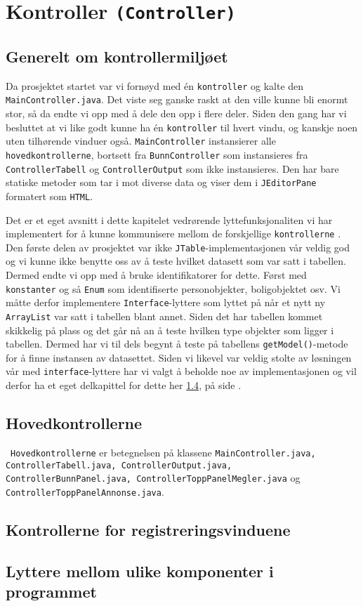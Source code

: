 \section{Kontroller \texttt{(Controller)}} \label{sec:kontroller}

\subsection{Generelt om kontrollermiljøet}
Da prosjektet startet var vi fornøyd med én \texttt{kontroller} og kalte den \texttt{MainController.java}. Det viste seg ganske raskt at den ville kunne bli enormt stor, så da endte vi opp med å dele den opp i flere deler. Siden den gang har vi besluttet at vi like godt kunne ha én \texttt{kontroller} til hvert vindu, og kanskje noen uten tilhørende vinduer også.
\texttt{MainController} instansierer alle \texttt{hovedkontrollerne}, bortsett fra \texttt{BunnController} som instansieres fra \texttt{ControllerTabell} og \texttt{ControllerOutput} som ikke instansieres. Den har bare statiske metoder som tar i mot diverse data og viser dem i \texttt{JEditorPane} formatert som \texttt{HTML}.

Det er et eget avsnitt i dette kapitelet vedrørende lyttefunksjonaliten vi har implementert for å kunne kommunisere mellom de forskjellige \texttt{kontrollerne} .
Den første delen av prosjektet var ikke \texttt{JTable}-implementasjonen vår veldig god og vi kunne ikke benytte oss av å teste hvilket datasett som var satt i tabellen. Dermed endte vi opp med å bruke identifikatorer for dette. Først med \texttt{konstanter} og så \texttt{Enum} som identifiserte personobjekter, boligobjektet osv.
Vi måtte derfor implementere \texttt{Interface}-lyttere som lyttet på når et nytt ny \texttt{ArrayList} var satt i tabellen blant annet.
Siden det har tabellen kommet skikkelig på plass og det går nå an å teste hvilken type objekter som ligger i tabellen. Dermed har vi til dels begynt å teste på tabellens \texttt{getModel()}-metode for å finne instansen av datasettet.
Siden vi likevel var veldig  stolte av løsningen vår med \texttt{interface}-lyttere har vi valgt å beholde noe av implementasjonen og vil derfor ha et eget delkapittel for dette her \ref{sec:kontrollerlyttere}, på side \pageref{sec:kontrollerlyttere}.


\subsection{Hovedkontrollerne} \
\texttt{Hovedkontrollerne} er betegnelsen på klassene \texttt{MainController.java, ControllerTabell.java, ControllerOutput.java, ControllerBunnPanel.java, ControllerToppPanelMegler.java} og \texttt{ControllerToppPanelAnnonse.java}.


\subsection{Kontrollerne for registreringsvinduene} \label{sec:regkontrollere}


\subsection{Lyttere mellom ulike komponenter i programmet} \label{sec:kontrollerlyttere}